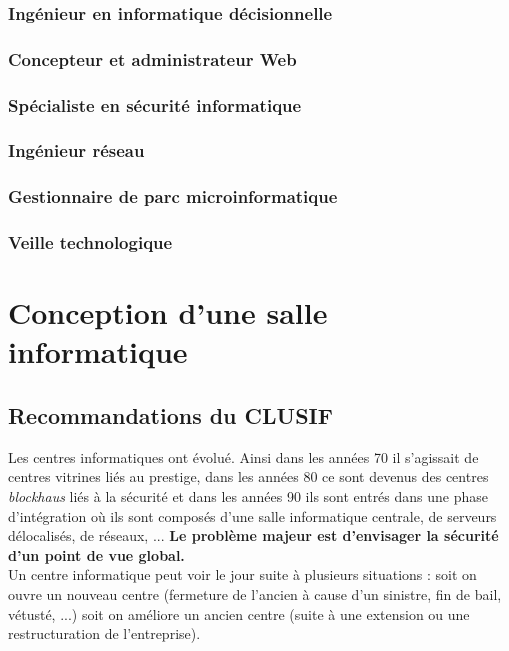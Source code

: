 \documentclass[10pt,a4paper,oneside,titlepage]{report}
\newcommand{\titre}[1]{\textcolor{title}{#1}}
\newcommand{\newterm}[1]{\textit{#1}}
\newcommand{\strong}[1]{\textbf{\titre{#1}}}
\begin{document}
\begin{sffamily}
\subsubsection{Ingénieur en informatique décisionnelle}

\subsubsection{Concepteur et administrateur Web}

\subsubsection{Spécialiste en sécurité informatique}

\subsubsection{Ingénieur réseau}

\subsubsection{Gestionnaire de parc microinformatique}

\subsubsection{Veille technologique}

\section{Conception d'une salle informatique}

\subsection{Recommandations du CLUSIF}

Les centres informatiques ont évolué. Ainsi dans les années 70 il s'agissait de centres vitrines liés au prestige, dans les années 80 ce sont devenus des centres 
\newterm{blockhaus} liés à la sécurité et dans les années 90 ils sont entrés dans une phase d'intégration où ils sont composés d'une salle informatique centrale, de 
serveurs délocalisés, de réseaux, ... \strong{Le problème majeur est d'envisager la sécurité d'un point de vue global.} \\

Un centre informatique peut voir le jour suite à plusieurs situations : soit on ouvre un nouveau centre (fermeture de l'ancien à cause d'un sinistre, fin de bail, vétusté, 
...) soit on améliore un ancien centre (suite à une extension ou une restructuration de l'entreprise). \\


\end{sffamily}
\end{document}
